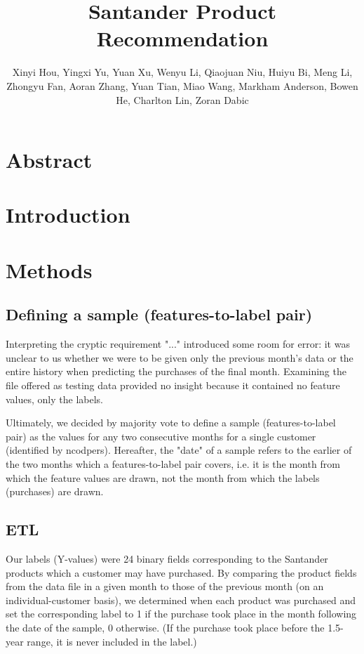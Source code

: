 \documentclass{report}
\begin{document}
	
\title{Santander Product Recommendation}

\author{Xinyi Hou,
	Yingxi Yu,
	Yuan Xu,
	Wenyu Li,
	Qiaojuan Niu,
	Huiyu Bi,
	Meng Li,
	Zhongyu Fan,
	Aoran Zhang,
	Yuan Tian,
	Miao Wang,
	Markham Anderson,
	Bowen He,
	Charlton Lin,
	Zoran Dabic}

\section{Abstract}

\section{Introduction}

\section{Methods}

\subsection{Defining a sample (features-to-label pair)}

Interpreting the cryptic requirement  "..." introduced some room for error: it was unclear to us whether we were to be given only the previous month's data or the entire history when predicting the purchases of the final month. Examining the file offered as testing data provided no insight because it contained no feature values, only the labels.

Ultimately, we decided by majority vote to define a sample (features-to-label pair) as the values for any two consecutive months for a single customer (identified by ncodpers). Hereafter, the "date" of a sample refers to the earlier of the two months which a features-to-label pair covers, i.e. it is the month from which the feature values are drawn, not the month from which the labels (purchases) are drawn.

\subsection{ETL}

Our labels (Y-values) were 24 binary fields corresponding to the Santander products which a customer may have purchased. By comparing the product fields from the data file in a given month to those of the previous month (on an individual-customer basis), we determined when each product was purchased and set the corresponding label to 1 if the purchase took place in the month following the date of the sample, 0 otherwise. (If the purchase took place before the 1.5-year range, it is never included in the label.)
\end{document}
